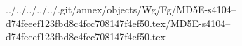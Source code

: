 ../../../../../.git/annex/objects/Wg/Fg/MD5E-s4104--d74feeef123fbd8c4fcc708147f4ef50.tex/MD5E-s4104--d74feeef123fbd8c4fcc708147f4ef50.tex
